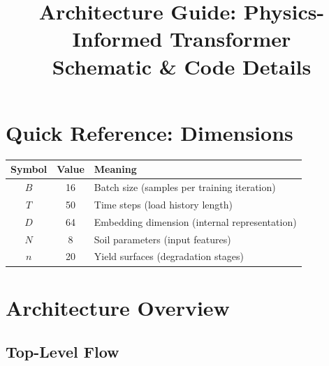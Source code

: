 \documentclass[11pt,a4paper]{article}
\title{Architecture Guide: Physics-Informed Transformer\\Schematic \& Code Details}
\author{}
\date{}
\begin{document}
\maketitle
\tableofcontents
\newpage

\section{Quick Reference: Dimensions}

\begin{table}[H]
\centering
\begin{tabular}{|c|c|l|}
\hline
\textbf{Symbol} & \textbf{Value} & \textbf{Meaning} \\
\hline
$B$ & 16 & Batch size (samples per training iteration) \\
$T$ & 50 & Time steps (load history length) \\
$D$ & 64 & Embedding dimension (internal representation) \\
$N$ & 8 & Soil parameters (input features) \\
$n$ & 20 & Yield surfaces (degradation stages) \\
\hline
\end{tabular}
\end{table}

\section{Architecture Overview}

\subsection{Top-Level Flow}
\end{document}
